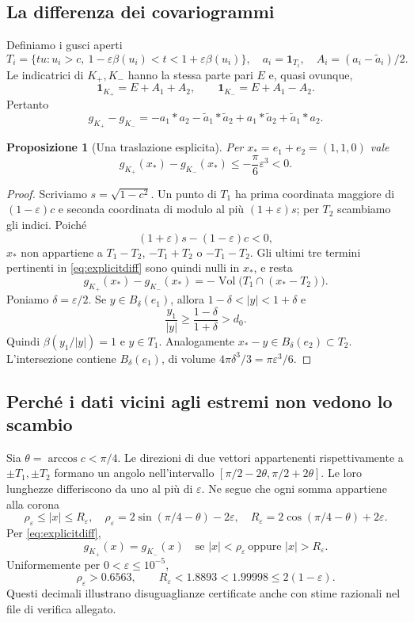 \documentclass[11pt,a4paper]{article}
\newtheorem{proposition}[theorem]{Proposizione}
\theoremstyle{remark}
\newcommand{\ind}{\mathbf 1}
\newcommand{\vol}{\operatorname{Vol}}
\begin{document}
\subsection*{La differenza dei covariogrammi}
Definiamo i gusci aperti
\[
T_i=\{tu:u_i>c,\ 1-\varepsilon\beta(u_i)<t<1+\varepsilon\beta(u_i)\},
\quad a_i=\ind_{T_i},\quad A_i=(a_i-\widetilde a_i)/2.
\]
Le indicatrici di $K_+,K_-$ hanno la stessa parte pari $E$ e, quasi ovunque,
\[
\ind_{K_+}=E+A_1+A_2,\qquad
\ind_{K_-}=E+A_1-A_2.
\]
Pertanto
\begin{equation}\label{eq:explicitdiff}
g_{K_+}-g_{K_-}
=-a_1*a_2-\widetilde a_1*\widetilde a_2
 +a_1*\widetilde a_2+\widetilde a_1*a_2.
\end{equation}

\begin{proposition}[Una traslazione esplicita]\label{prop:witness}
Per $x_*=e_1+e_2=(1,1,0)$ vale
\[
g_{K_+}(x_*)-g_{K_-}(x_*)\le-\frac\pi6\varepsilon^3<0.
\]
\end{proposition}
\begin{proof}
Scriviamo $s=\sqrt{1-c^2}$. Un punto di $T_1$ ha prima coordinata
maggiore di $(1-\varepsilon)c$ e seconda coordinata di modulo al più
$(1+\varepsilon)s$; per $T_2$ scambiamo gli indici.
Poiché
\[
(1+\varepsilon)s-(1-\varepsilon)c<0,
\]
$x_*$ non appartiene a $T_1-T_2$, $-T_1+T_2$ o $-T_1-T_2$.
Gli ultimi tre termini pertinenti in \eqref{eq:explicitdiff} sono quindi
nulli in $x_*$, e resta
\[
g_{K_+}(x_*)-g_{K_-}(x_*)=-\vol\bigl(T_1\cap(x_*-T_2)\bigr).
\]
Poniamo $\delta=\varepsilon/2$. Se $y\in B_\delta(e_1)$, allora
$1-\delta<|y|<1+\delta$ e
\[
\frac{y_1}{|y|}\ge\frac{1-\delta}{1+\delta}>d_0.
\]
Quindi $\beta(y_1/|y|)=1$ e $y\in T_1$. Analogamente
$x_*-y\in B_\delta(e_2)\subset T_2$.
L'intersezione contiene $B_\delta(e_1)$, di volume
$4\pi\delta^3/3=\pi\varepsilon^3/6$.
\end{proof}

\subsection*{Perché i dati vicini agli estremi non vedono lo scambio}
Sia $\theta=\arccos c<\pi/4$. Le direzioni di due vettori appartenenti
rispettivamente a $\pm T_1,\pm T_2$ formano un angolo nell'intervallo
$[\pi/2-2\theta,\pi/2+2\theta]$. Le loro lunghezze differiscono da uno
al più di $\varepsilon$. Ne segue che ogni somma appartiene alla corona
\[
\rho_\varepsilon\le |x|\le R_\varepsilon,
\quad
\rho_\varepsilon=2\sin(\pi/4-\theta)-2\varepsilon,
\quad
R_\varepsilon=2\cos(\pi/4-\theta)+2\varepsilon.
\]
Per \eqref{eq:explicitdiff},
\begin{equation}\label{eq:annulus}
g_{K_+}(x)=g_{K_-}(x)
\quad\text{se }|x|<\rho_\varepsilon\ \text{oppure }|x|>R_\varepsilon.
\end{equation}
Uniformemente per $0<\varepsilon\le10^{-5}$,
\[
\rho_\varepsilon>0.6563,\qquad R_\varepsilon<1.8893
<1.99998\le2(1-\varepsilon).
\]
Questi decimali illustrano disuguaglianze certificate anche con stime
razionali nel file di verifica allegato.
\end{document}
